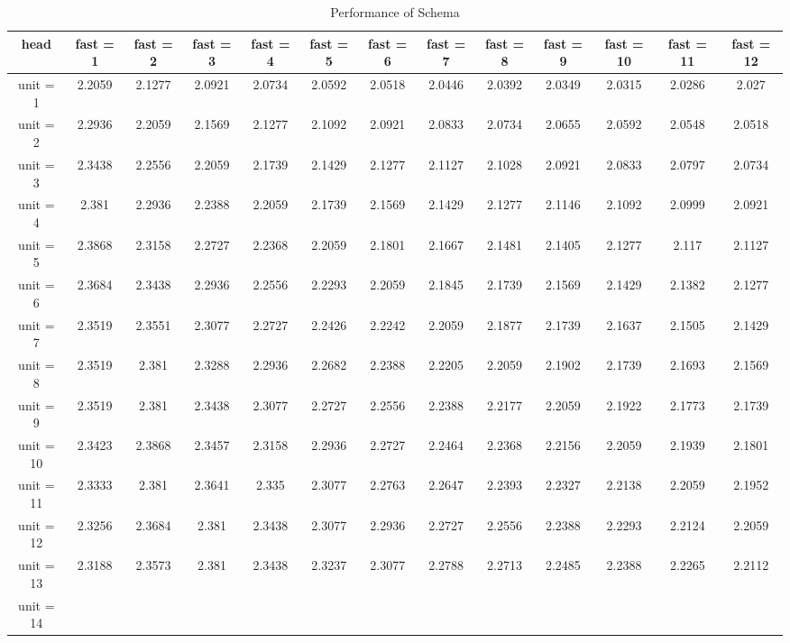 \begin{table*}[ht]
\tabcolsep=0.11cm
\tiny
\caption{Performance of Schema} 
\label{performance-table}
\begin{tabular}{|c|c|c|c|c|c|c|c|c|c|c|c|c|}
\hline
head &  fast = 1 & fast = 2 & fast = 3 & fast = 4 & fast = 5 & fast = 6 & fast = 7 & fast = 8 & fast = 9 & fast = 10 & fast = 11 & fast = 12 \\ \hline
unit = 1 &
2.2059 & 2.1277 & 2.0921 & 2.0734 & 2.0592 & 2.0518 & 2.0446 & 2.0392 & 2.0349 & 2.0315 & 2.0286 & 2.027 \\
\hline
unit = 2 &
2.2936 & 2.2059 & 2.1569 & 2.1277 & 2.1092 & 2.0921 & 2.0833 & 2.0734 & 2.0655 & 2.0592 & 2.0548 & 2.0518 \\
\hline
unit = 3 &
2.3438 & 2.2556 & 2.2059 & 2.1739 & 2.1429 & 2.1277 & 2.1127 & 2.1028 & 2.0921 & 2.0833 & 2.0797 & 2.0734 \\
\hline
unit = 4 &
2.381 & 2.2936 & 2.2388 & 2.2059 & 2.1739 & 2.1569 & 2.1429 & 2.1277 & 2.1146 & 2.1092 & 2.0999 & 2.0921 \\
\hline
unit = 5 &
2.3868 & 2.3158 & 2.2727 & 2.2368 & 2.2059 & 2.1801 & 2.1667 & 2.1481 & 2.1405 & 2.1277 & 2.117 & 2.1127 \\
\hline
unit = 6 &
2.3684 & 2.3438 & 2.2936 & 2.2556 & 2.2293 & 2.2059 & 2.1845 & 2.1739 & 2.1569 & 2.1429 & 2.1382 & 2.1277 \\
\hline
unit = 7 &
2.3519 & 2.3551 & 2.3077 & 2.2727 & 2.2426 & 2.2242 & 2.2059 & 2.1877 & 2.1739 & 2.1637 & 2.1505 & 2.1429 \\
\hline
unit = 8 &
2.3519 & 2.381 & 2.3288 & 2.2936 & 2.2682 & 2.2388 & 2.2205 & 2.2059 & 2.1902 & 2.1739 & 2.1693 & 2.1569 \\
\hline
unit = 9 &
2.3519 & 2.381 & 2.3438 & 2.3077 & 2.2727 & 2.2556 & 2.2388 & 2.2177 & 2.2059 & 2.1922 & 2.1773 & 2.1739 \\
\hline
unit = 10 &
2.3423 & 2.3868 & 2.3457 & 2.3158 & 2.2936 & 2.2727 & 2.2464 & 2.2368 & 2.2156 & 2.2059 & 2.1939 & 2.1801 \\
\hline
unit = 11 &
2.3333 & 2.381 & 2.3641 & 2.335 & 2.3077 & 2.2763 & 2.2647 & 2.2393 & 2.2327 & 2.2138 & 2.2059 & 2.1952 \\
\hline
unit = 12 &
2.3256 & 2.3684 & 2.381 & 2.3438 & 2.3077 & 2.2936 & 2.2727 & 2.2556 & 2.2388 & 2.2293 & 2.2124 & 2.2059 \\
\hline
unit = 13 &
2.3188 & 2.3573 & 2.381 & 2.3438 & 2.3237 & 2.3077 & 2.2788 & 2.2713 & 2.2485 & 2.2388 & 2.2265 & 2.2112 \\
\hline
unit = 14 &

\end{tabular}
\end{table*}
